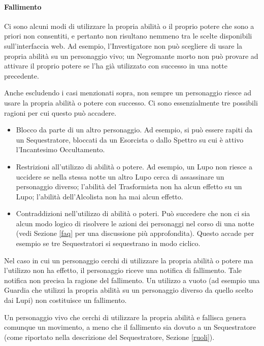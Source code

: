 \documentclass[a4paper,10pt]{article}
\begin{document}
\paragraph{Fallimento} Ci sono alcuni modi di utilizzare la propria abilità o il proprio potere che sono a priori non consentiti, e pertanto non risultano nemmeno tra le scelte disponibili sull'interfaccia web. Ad esempio, l'Investigatore non può scegliere di usare la propria abilità su un personaggio vivo; un Negromante morto non può provare ad attivare il proprio potere se l'ha già utilizzato con successo in una notte precedente.

Anche escludendo i casi menzionati sopra, non sempre un personaggio riesce ad usare la propria abilità o potere con successo. Ci sono essenzialmente tre possibili ragioni per cui questo può accadere.

\begin{itemize}
	\item Blocco da parte di un altro personaggio. Ad esempio, si può essere rapiti da un Sequestratore, bloccati da un Esorcista o dallo Spettro su cui è attivo l'Incantesimo Occultamento.
	\item Restrizioni all'utilizzo di abilità o potere. Ad esempio, un Lupo non riesce a uccidere se nella stessa notte un altro Lupo cerca di assassinare un personaggio diverso; l'abilità del Trasformista non ha alcun effetto su un Lupo; l'abilità dell'Alcolista non ha mai alcun effetto.
	\item Contraddizioni nell'utilizzo di abilità o poteri. Può succedere che non ci sia alcun modo logico di risolvere le azioni dei personaggi nel corso di una notte (vedi Sezione \ref{faq} per una discussione più approfondita). Questo accade per esempio se tre Sequestratori si sequestrano in modo ciclico.
\end{itemize}

Nel caso in cui un personaggio cerchi di utilizzare la propria abilità o potere ma l'utilizzo non ha effetto, il personaggio riceve una notifica di fallimento. Tale notifica non precisa la ragione del fallimento. Un utilizzo a vuoto (ad esempio una Guardia che utilizzi la propria abilità su un personaggio diverso da quello scelto dai Lupi) non costituisce un fallimento.

Un personaggio vivo che cerchi di utilizzare la propria abilità e fallisca genera comunque un movimento, a meno che il fallimento sia dovuto a un Sequestratore (come riportato nella descrizione del Sequestratore, Sezione \ref{ruoli}).
\end{document}
